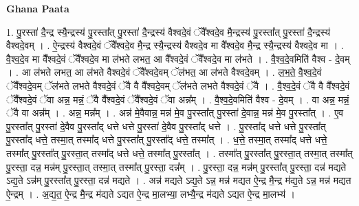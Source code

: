 \documentclass[17pt]{extarticle}
\begin{document}
\textbf{Ghana Paata } \newline

1. पु॒रस्ता॑ दै॒न्द्र स्यै॒न्द्रस्य॑ पु॒रस्ता᳚त् पु॒रस्ता॑ दै॒न्द्रस्य॑ वैश्वदे॒वं ॅवै᳚श्वदे॒व मै॒न्द्रस्य॑ पु॒रस्ता᳚त् पु॒रस्ता॑ दै॒न्द्रस्य॑ वैश्वदे॒वम् । . ऐ॒न्द्रस्य॑ वैश्वदे॒वं ॅवै᳚श्वदे॒व मै॒न्द्र स्यै॒न्द्रस्य॑ वैश्वदे॒व मा वै᳚श्वदे॒व मै॒न्द्र
स्यै॒न्द्रस्य॑ वैश्वदे॒व मा । . वै॒श्व॒दे॒व मा वै᳚श्वदे॒वं ॅवै᳚श्वदे॒व मा ल॑भते लभत॒ आ वै᳚श्वदे॒वं ॅवै᳚श्वदे॒व मा ल॑भते । . वै॒श्व॒दे॒वमिति॑ वैश्व - दे॒वम् । . आ ल॑भते लभत॒ आ ल॑भते वैश्वदे॒वं ॅवै᳚श्वदे॒वम् ॅल॑भत॒ आ ल॑भते वैश्वदे॒वम् । . ल॒भ॒ते॒ वै॒श्व॒दे॒वं ॅवै᳚श्वदे॒वम् ॅल॑भते लभते वैश्वदे॒वं ॅवै वै वै᳚श्वदे॒वम् ॅल॑भते लभते वैश्वदे॒वं ॅवै । . वै॒श्व॒दे॒वं ॅवै वै वै᳚श्वदे॒वं ॅवै᳚श्वदे॒वं ॅवा अन्न॒ मन्नं॒ ॅवै वै᳚श्वदे॒वं ॅवै᳚श्वदे॒वं ॅवा अन्न᳚म् । . वै॒श्व॒दे॒वमिति॑ वैश्व - दे॒वम् । . वा अन्न॒ मन्नं॒ ॅवै वा अन्न᳚म् । . अन्न॒ मन्न᳚म् । . अन्न॑ मे॒वैवान्न॒ मन्न॑ मे॒व पु॒रस्ता᳚त् पु॒रस्ता॑ दे॒वान्न॒ मन्न॑ मे॒व पु॒रस्ता᳚त् । . ए॒व पु॒रस्ता᳚त् पु॒रस्ता॑ दे॒वैव पु॒रस्ता᳚द् धत्ते धत्ते पु॒रस्ता॑ दे॒वैव पु॒रस्ता᳚द् धत्ते । . पु॒रस्ता᳚द् धत्ते धत्ते पु॒रस्ता᳚त् पु॒रस्ता᳚द् धत्ते॒ तस्मा॒त् तस्मा᳚द् धत्ते पु॒रस्ता᳚त् पु॒रस्ता᳚द् धत्ते॒ तस्मा᳚त् । . ध॒त्ते॒ तस्मा॒त् तस्मा᳚द् धत्ते धत्ते॒ तस्मा᳚त् पु॒रस्ता᳚त् पु॒रस्ता॒त् तस्मा᳚द् धत्ते धत्ते॒ तस्मा᳚त् पु॒रस्ता᳚त् । . तस्मा᳚त् पु॒रस्ता᳚त् पु॒रस्ता॒त् तस्मा॒त् तस्मा᳚त् पु॒रस्ता॒ दन्न॒ मन्न॑म् पु॒रस्ता॒त् तस्मा॒त् तस्मा᳚त् पु॒रस्ता॒ दन्न᳚म् । . पु॒रस्ता॒ दन्न॒ मन्न॑म् पु॒रस्ता᳚त् पु॒रस्ता॒ दन्न॑ मद्यते ऽद्य॒ते ऽन्न॑म् पु॒रस्ता᳚त् पु॒रस्ता॒ दन्न॑ मद्यते । . अन्न॑ मद्यते ऽद्य॒ते ऽन्न॒ मन्न॑ मद्यत ऐ॒न्द्र मै॒न्द्र म॑द्य॒ते ऽन्न॒ मन्न॑ मद्यत ऐ॒न्द्रम् । . अ॒द्य॒त॒ ऐ॒न्द्र मै॒न्द्र म॑द्यते ऽद्यत ऐ॒न्द्र मा॒लभ्या॒ लभ्यै॒न्द्र म॑द्यते ऽद्यत ऐ॒न्द्र मा॒लभ्य॑ । \newline
\end{document}
